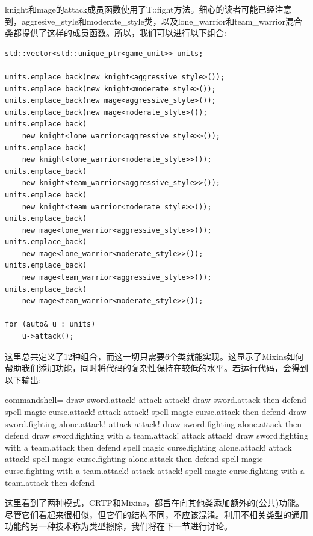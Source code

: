 knight和mage的attack成员函数使用了T::fight方法。细心的读者可能已经注意到，aggresive\_style和moderate\_style类，以及lone\_warrior和team\_warrior混合类都提供了这样的成员函数。所以，我们可以进行以下组合:

\begin{lstlisting}[style=styleCXX]
std::vector<std::unique_ptr<game_unit>> units;

units.emplace_back(new knight<aggressive_style>());
units.emplace_back(new knight<moderate_style>());
units.emplace_back(new mage<aggressive_style>());
units.emplace_back(new mage<moderate_style>());
units.emplace_back(
	new knight<lone_warrior<aggressive_style>>());
units.emplace_back(
	new knight<lone_warrior<moderate_style>>());
units.emplace_back(
	new knight<team_warrior<aggressive_style>>());
units.emplace_back(
	new knight<team_warrior<moderate_style>>());
units.emplace_back(
	new mage<lone_warrior<aggressive_style>>());
units.emplace_back(
	new mage<lone_warrior<moderate_style>>());
units.emplace_back(
	new mage<team_warrior<aggressive_style>>());
units.emplace_back(
	new mage<team_warrior<moderate_style>>());

for (auto& u : units)
	u->attack();
\end{lstlisting}

这里总共定义了12种组合，而这一切只需要6个类就能实现。这显示了Mixins如何帮助我们添加功能，同时将代码的复杂性保持在较低的水平。若运行代码，会得到以下输出:

\begin{tcblisting}{commandshell={}}
draw sword.attack! attack attack!
draw sword.attack then defend
spell magic curse.attack! attack attack!
spell magic curse.attack then defend
draw sword.fighting alone.attack! attack attack!
draw sword.fighting alone.attack then defend
draw sword.fighting with a team.attack! attack attack!
draw sword.fighting with a team.attack then defend
spell magic curse.fighting alone.attack! attack attack!
spell magic curse.fighting alone.attack then defend
spell magic curse.fighting with a team.attack! attack attack!
spell magic curse.fighting with a team.attack then defend
\end{tcblisting}

这里看到了两种模式，CRTP和Mixins，都旨在向其他类添加额外的(公共)功能。尽管它们看起来很相似，但它们的结构不同，不应该混淆。利用不相关类型的通用功能的另一种技术称为类型擦除，我们将在下一节进行讨论。



































